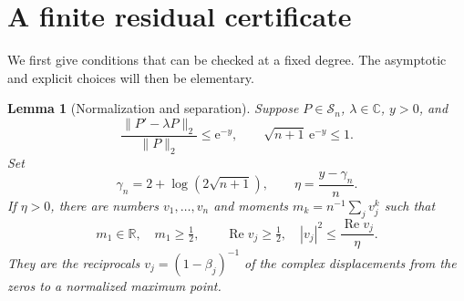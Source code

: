 \documentclass[11pt]{article}
\newtheorem{lemma}[theorem]{Lemma}
\theoremstyle{remark}\newtheorem{remark}[theorem]{Remark}
\newcommand{\C}{\mathbb C}
\newcommand{\norm}[1]{\lVert #1\rVert}
\newcommand{\Rea}{\operatorname{Re}}
\newcommand{\ee}{\mathrm e}
\begin{document}
\section{A finite residual certificate}
We first give conditions that can be checked at a fixed degree.
The asymptotic and explicit choices will then be elementary.

\begin{lemma}[Normalization and separation]\label{lem:normalize}
Suppose \(P\in\mathcal S_n\), \(\lambda\in\C\), \(y>0\), and
\[
 \frac{\norm{P'-\lambda P}_2}{\norm P_2}\le\ee^{-y},
 \qquad \sqrt{n+1}\,\ee^{-y}\le1.
\]
Set
\begin{equation}\label{eq:eta}
 \gamma_n=2+\log(2\sqrt{n+1}),\qquad
 \eta=\frac{y-\gamma_n}{n}.
\end{equation}
If \(\eta>0\), there are numbers \(v_1,\ldots,v_n\) and moments
\(m_k=n^{-1}\sum_jv_j^k\) such that
\begin{equation}\label{eq:geometry}
 m_1\in\mathbb R,\quad m_1\ge\tfrac12,\qquad
 \Rea v_j\ge\tfrac12,\quad |v_j|^2\le\frac{\Rea v_j}{\eta}.
\end{equation}
They are the reciprocals \(v_j=(1-\beta_j)^{-1}\) of the complex displacements
from the zeros to a normalized maximum point.
\end{lemma}
\end{document}
